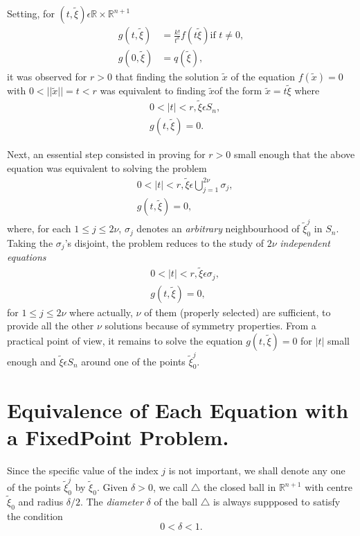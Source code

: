 Setting, for $(t, \widetilde{\xi}) \epsilon \mathbb{R} \times \mathbb{R}^{n+1}$
\begin{align*}
g(t, \widetilde{\xi}) & = \frac{k!}{t^{k}} f(t \widetilde{\xi}) \text{
if } t \neq 0,\\
g(0, \widetilde{\xi}) & = q(\widetilde{\xi}),
\end{align*}
it was observed for $r > 0$ that finding the solution $\widetilde{x}$
of the equation $f(\widetilde{x}) = 0$ with $0 < ||\widetilde{x}|| = t
< r$ was equivalent to finding $\widetilde{x}$\pageoriginale of the
form $\widetilde{x} = t\widetilde{\xi}$ where
\begin{align*}
& 0 < |t| < r, \widetilde{\xi} \epsilon S_{n},\\
& g(t, \widetilde{\xi}) = 0.
\end{align*}

Next, an essential step consisted in proving for $r > 0$ small enough
that the above equation was equivalent to solving the problem
\begin{align*}
& 0 < |t| < r, \widetilde{\xi} \epsilon \bigcup\limits_{j=1}^{2\nu}
  \sigma_{j},\\
& g(t, \widetilde{\xi}) = 0,
\end{align*}
where, for each $1 \leq j \leq 2\nu$, $\sigma_{j}$ denotes an {\em
  arbitrary} neighbourhood of $\widetilde{\xi}_{0}^{j}$ in
$S_{n}$. Taking the $\sigma_{j}$'s disjoint, the problem reduces to
the study of $2\nu$ {\em independent equations}
\begin{align*}
& 0 < |t| < r, \widetilde{\xi} \epsilon \sigma_{j},\\
& g(t, \widetilde{\xi}) = 0,
\end{align*}
for $1 \leq j \leq 2\nu$ where actually, $\nu$ of them (properly
selected) are sufficient, to provide all the other $\nu$ solutions
because of symmetry properties. From a practical point of view, it
remains to solve the equation $g(t, \widetilde{\xi}) = 0$ for $|t|$
small enough and $\widetilde{\xi} \epsilon S_{n}$ around one of the
points $\widetilde{\xi}_{0}^{j}$.

\section[Equivalence of Each Equation with a...]{Equivalence of Each
  Equation with a Fixed\hfil\break Point 
  Problem.}\label{chp4-sec2}

Since the specific value of the index $j$ is not important, we shall
denote any one of the points $\widetilde{\xi}_{0}^{j}$ by
$\widetilde{\xi}_{0}$. Given $\delta > 0$, we call\pageoriginale
$\triangle$ the closed ball in $\mathbb{R}^{n+1}$ with centre
$\widetilde{\xi}_{0}$ and radius $\delta / 2$. The {\em diameter}
$\delta$ of the ball $\triangle$ is always suppposed to satisfy the
condition
\begin{equation*}
0 < \delta < 1.\tag{2.1}\label{chap4-eq2.1}
\end{equation*}

